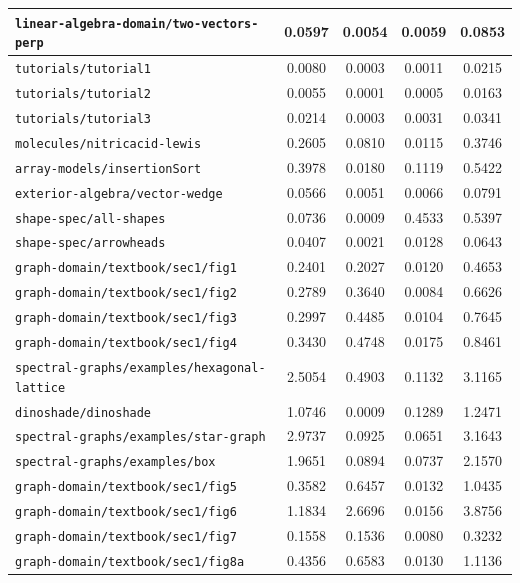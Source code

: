 \begin{longtable}{|p{6.5cm}|c|c|c|c|}
    \texttt{linear-algebra-domain/two-vectors-perp} & 0.0597 & 0.0054 & 0.0059 & 0.0853 \\ \hline
    \texttt{tutorials/tutorial1} & 0.0080 & 0.0003 & 0.0011 & 0.0215 \\ \hline
    \texttt{tutorials/tutorial2} & 0.0055 & 0.0001 & 0.0005 & 0.0163 \\ \hline
    \texttt{tutorials/tutorial3} & 0.0214 & 0.0003 & 0.0031 & 0.0341 \\ \hline
    \texttt{molecules/nitricacid-lewis} & 0.2605 & 0.0810 & 0.0115 & 0.3746 \\ \hline
    \texttt{array-models/insertionSort} & 0.3978 & 0.0180 & 0.1119 & 0.5422 \\ \hline
    \texttt{exterior-algebra/vector-wedge} & 0.0566 & 0.0051 & 0.0066 & 0.0791 \\ \hline
    \texttt{shape-spec/all-shapes} & 0.0736 & 0.0009 & 0.4533 & 0.5397 \\ \hline
    \texttt{shape-spec/arrowheads} & 0.0407 & 0.0021 & 0.0128 & 0.0643 \\ \hline
    \texttt{graph-domain/textbook/sec1/fig1} & 0.2401 & 0.2027 & 0.0120 & 0.4653 \\ \hline
    \texttt{graph-domain/textbook/sec1/fig2} & 0.2789 & 0.3640 & 0.0084 & 0.6626 \\ \hline
    \texttt{graph-domain/textbook/sec1/fig3} & 0.2997 & 0.4485 & 0.0104 & 0.7645 \\ \hline
    \texttt{graph-domain/textbook/sec1/fig4} & 0.3430 & 0.4748 & 0.0175 & 0.8461 \\ \hline
    \texttt{spectral-graphs/examples/hexagonal-lattice} & 2.5054 & 0.4903 & 0.1132 & 3.1165 \\ \hline
    \texttt{dinoshade/dinoshade} & 1.0746 & 0.0009 & 0.1289 & 1.2471 \\ \hline
    \texttt{spectral-graphs/examples/star-graph} & 2.9737 & 0.0925 & 0.0651 & 3.1643 \\ \hline
    \texttt{spectral-graphs/examples/box} & 1.9651 & 0.0894 & 0.0737 & 2.1570 \\ \hline
    \texttt{graph-domain/textbook/sec1/fig5} & 0.3582 & 0.6457 & 0.0132 & 1.0435 \\ \hline
    \texttt{graph-domain/textbook/sec1/fig6} & 1.1834 & 2.6696 & 0.0156 & 3.8756 \\ \hline
    \texttt{graph-domain/textbook/sec1/fig7} & 0.1558 & 0.1536 & 0.0080 & 0.3232 \\ \hline
    \texttt{graph-domain/textbook/sec1/fig8a} & 0.4356 & 0.6583 & 0.0130 & 1.1136 \\ \hline

\end{longtable}
